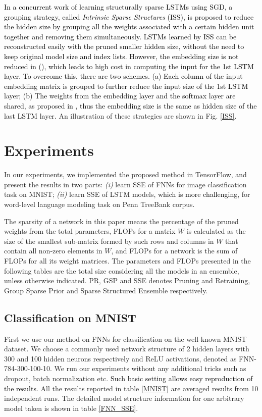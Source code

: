 \documentclass{article} %
\newcommand{\ozj}{\textcolor{black}}
\begin{document}
\ozj{
In a concurrent work of learning structurally sparse LSTMs \citet{wen2017learning} using SGD, a grouping strategy, called \textit{Intrinsic Sparse Structures} (ISS), is proposed to reduce the hidden size by grouping all the weights associated with a certain hidden unit together and removing them simultaneously.
LSTMs learned by ISS can be reconstructed easily with the pruned smaller hidden size, without the need to keep original model size and index lists.
However, the embedding size is not reduced in (\citet{wen2017learning}), which leads to high cost in computing the input for the 1st LSTM layer.
To overcome this, there are two schemes. (a) Each column of the input embedding matrix is grouped to further reduce the input size of the 1st LSTM layer; (b) The weights from the embedding layer and the softmax layer are shared, as proposed in \citet{inan2016tying}, thus the embedding size is the same as hidden size of the last LSTM layer.
}
An illustration of these strategies are shown in Fig. \ref{ISS}. 

\section{Experiments}

In our experiments, we implemented the proposed method in TensorFlow, and present the results in two parts: \textit{(i)} learn SSE of FNNs for image classification task on MNIST; \textit{(ii)} learn SSE of LSTM models, \ozj{which is more challenging}, for word-level language modeling task on Penn TreeBank corpus.

The sparsity of a network in this paper means the percentage of the pruned weights from the total parameters, FLOPs for a matrix $W$ is calculated as the size of the smallest sub-matrix formed by such rows and columns in $W$ that contain all non-zero elements in $W$, and FLOPs for a network is the sum of FLOPs for all its weight matrices.
The parameters and FLOPs presented in the following tables are the total size considering all the models in an ensemble, unless otherwise indicated. 
PR, GSP and SSE denotes Pruning and Retraining, Group Sparse Prior and Sparse Structured Ensemble respectively. 

\subsection{Classification on MNIST}



First we use our method on FNNs for classification on the well-known MNIST dataset. We choose a commonly used network structure of 2 hidden layers with 300 and 100 hidden neurons respectively and ReLU activations, denoted as FNN-784-300-100-10. We run our experiments without any additional tricks such as dropout, batch normalization etc. 
\ozj{Such basic setting allows easy reproduction of the results.}
All the results reported in table \ref{MNIST} are averaged results from 10 independent runs. 
The detailed model structure information for one arbitrary model taken is shown in table \ref{FNN_SSE}.
\end{document}
